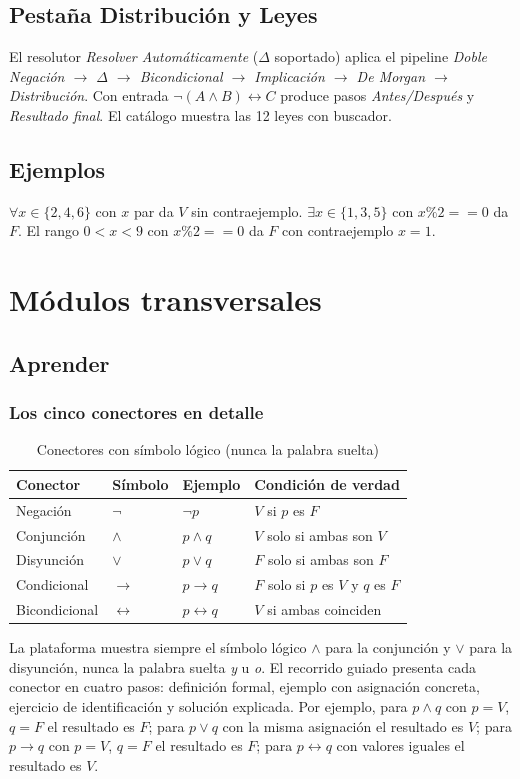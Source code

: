 \documentclass[11pt,a4paper,openany]{book}
\begin{document}
\section{Pesta\~na Distribuci\'on y Leyes}
El resolutor \textit{Resolver Autom\'aticamente} ($\Delta$ soportado) aplica el pipeline \textit{Doble Negaci\'on $\to$ $\Delta$ $\to$ Bicondicional $\to$ Implicaci\'on $\to$ De Morgan $\to$ Distribuci\'on}. Con entrada $\lnot(A \land B) \leftrightarrow C$ produce pasos \textit{Antes/Despu\'es} y \textit{Resultado final}. El cat\'alogo muestra las 12 leyes con buscador.

\section{Ejemplos}
$\forall x \in \{2,4,6\}$ con $x$ par da $V$ sin contraejemplo. $\exists x \in \{1,3,5\}$ con $x \% 2 == 0$ da $F$. El rango $0 < x < 9$ con $x \% 2 == 0$ da $F$ con contraejemplo $x = 1$.

\chapter{M\'odulos transversales}
\label{ch:transversales}
\section{Aprender}
\subsection{Los cinco conectores en detalle}
\begin{table}[H]
\centering
\caption{Conectores con s\'imbolo l\'ogico (nunca la palabra suelta)}
\label{tab:conectores-det}
\begin{tabular}{llll}
\toprule
Conector & S\'imbolo & Ejemplo & Condici\'on de verdad \\
\midrule
Negaci\'on & $\lnot$ & $\lnot p$ & $V$ si $p$ es $F$ \\
Conjunci\'on & $\land$ & $p \land q$ & $V$ solo si ambas son $V$ \\
Disyunci\'on & $\lor$ & $p \lor q$ & $F$ solo si ambas son $F$ \\
Condicional & $\to$ & $p \to q$ & $F$ solo si $p$ es $V$ y $q$ es $F$ \\
Bicondicional & $\leftrightarrow$ & $p \leftrightarrow q$ & $V$ si ambas coinciden \\
\bottomrule
\end{tabular}
\end{table}
La plataforma muestra siempre el s\'imbolo l\'ogico $\land$ para la conjunci\'on y $\lor$ para la disyunci\'on, nunca la palabra suelta \textit{y} u \textit{o}. El recorrido guiado presenta cada conector en cuatro pasos: definici\'on formal, ejemplo con asignaci\'on concreta, ejercicio de identificaci\'on y soluci\'on explicada. Por ejemplo, para $p \land q$ con $p = V$, $q = F$ el resultado es $F$; para $p \lor q$ con la misma asignaci\'on el resultado es $V$; para $p \to q$ con $p = V$, $q = F$ el resultado es $F$; para $p \leftrightarrow q$ con valores iguales el resultado es $V$.
\end{document}

